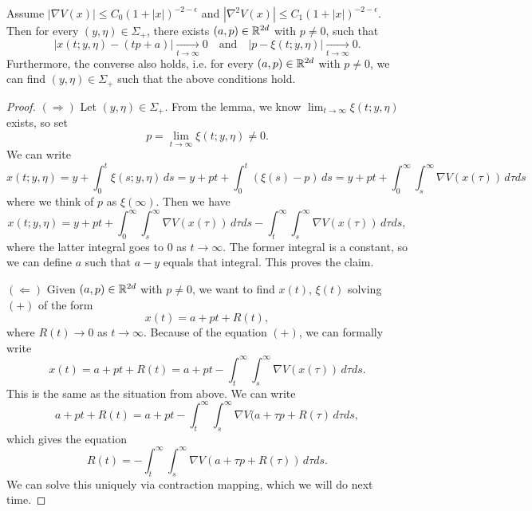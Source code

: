\begin{prop}\label{prop:classical-scattering}
  Assume $|\nabla V(x)| \le C_0 (1 + |x|)^{-2 - \epsilon}$
  and $|\nabla^2 V(x)| \le C_1 (1 + |x|)^{-2 - \epsilon}$.
  Then for every $(y, \eta) \in \Sigma_+$,
  there exists $(a, p) \in \mathbb{R}^{2d}$ with
  $p \ne 0$, such that
  \[
    |x(t; y, \eta) - (tp + a)| \xrightarrow[t \to \infty]{} 0 \quad \text{and} \quad
    |p - \xi(t; y, \eta)| \xrightarrow[t \to \infty]{} 0.
  \]
  Furthermore, the converse also holds, i.e.
  for every $(a, p) \in \mathbb{R}^{2d}$ with $p \ne 0$,
  we can find $(y, \eta) \in \Sigma_+$ such that
  the above conditions hold.
\end{prop}

\begin{proof}
  $(\Rightarrow)$ Let $(y, \eta) \in \Sigma_+$.
  From the lemma, we know
  $\lim_{t \to \infty} \xi(t; y, \eta)$ exists,
  so set
  \[
    p = \lim_{t \to \infty} \xi(t; y, \eta) \ne 0.
  \]
  We can write
  \[
    x(t; y, \eta)
    = y + \int_0^t \xi(s; y, \eta) \, ds
    = y + p t + \int_0^t (\xi(s) - p)\, ds
    = y + pt + \int_0^\infty \int_s^\infty \nabla V(x(\tau))\, d\tau ds
  \]
  where we think of $p$ as $\xi(\infty)$. Then 
  we have
  \[
    x(t; y, \eta) =
    y + pt + \int_0^\infty \int_s^\infty \nabla V(x(\tau))\, d\tau ds
    - \int_t^\infty \int_s^\infty \nabla V(x(\tau))\, d\tau ds,
  \]
  where the latter integral goes to $0$ as
  $t \to \infty$. The former integral is
  a constant, so we can define $a$ such that
  $a - y$ equals that integral. This proves
  the claim.

  $(\Leftarrow)$ Given $(a, p) \in \mathbb{R}^{2d}$ with
  $p \ne 0$, we want to find $x(t)$, $\xi(t)$
  solving $(+)$ of the form
  \[
    x(t) = a + pt + R(t),
  \]
  where $R(t) \to 0$ as $t \to \infty$. Because
  of the equation $(+)$, we can formally write
  \[
    x(t) = a + pt + R(t)
    = a + pt - \int_t^\infty \int_s^\infty \nabla V(x(\tau))\, d\tau ds.
  \]
  This is the same as the situation from above.
  We can write
  \[
    a + pt + R(t) = a + pt
    - \int_t^\infty \int_s^\infty \nabla V(a + \tau p + R(\tau)\, d\tau ds,
  \]
  which gives the equation
  \[
    R(t) = -\int_t^\infty \int_s^\infty \nabla V(a + \tau p + R(\tau))\, d\tau ds.
  \]
  We can solve this uniquely via
  contraction mapping, which we will do
  next time.
\end{proof}
